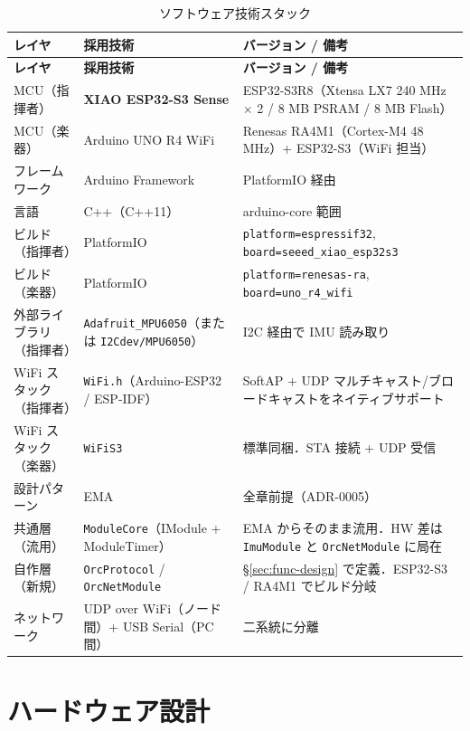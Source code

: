 \documentclass[lualatex,book,paper=a4paper,jafontsize=11.5pt,jafontscale=1.05]{jlreq}
\begin{document}
\begin{longtable}{p{} p{} p{}}
\caption{ソフトウェア技術スタック}\label{tab:sw-stack}\\
\toprule
\textbf{レイヤ} & \textbf{採用技術} & \textbf{バージョン / 備考} \\
\midrule
\endfirsthead
\toprule
\textbf{レイヤ} & \textbf{採用技術} & \textbf{バージョン / 備考} \\
\midrule
\endhead
MCU（指揮者）        & \textbf{XIAO ESP32-S3 Sense}  & ESP32-S3R8（Xtensa LX7 240 MHz × 2 / 8 MB PSRAM / 8 MB Flash） \\
MCU（楽器）          & Arduino UNO R4 WiFi          & Renesas RA4M1（Cortex-M4 48 MHz）+ ESP32-S3（WiFi 担当） \\
フレームワーク       & Arduino Framework            & PlatformIO 経由 \\
言語                 & C++（C++11）                 & arduino-core 範囲 \\
ビルド（指揮者）     & PlatformIO                   & \texttt{platform=espressif32}, \texttt{board=seeed\_xiao\_esp32s3} \\
ビルド（楽器）       & PlatformIO                   & \texttt{platform=renesas-ra}, \texttt{board=uno\_r4\_wifi} \\
外部ライブラリ（指揮者）& \texttt{Adafruit\_MPU6050}（または \texttt{I2Cdev/MPU6050}）& I2C 経由で IMU 読み取り \\
WiFi スタック（指揮者）& \texttt{WiFi.h}（Arduino-ESP32 / ESP-IDF）& SoftAP + UDP マルチキャスト/ブロードキャストをネイティブサポート \\
WiFi スタック（楽器）& \texttt{WiFiS3}              & 標準同梱．STA 接続 + UDP 受信 \\
設計パターン         & EMA                          & 全章前提（ADR-0005） \\
共通層（流用）       & \texttt{ModuleCore}（IModule + ModuleTimer） & EMA からそのまま流用．HW 差は \texttt{ImuModule} と \texttt{OrcNetModule} に局在 \\
自作層（新規）       & \texttt{OrcProtocol} / \texttt{OrcNetModule} & \S\ref{sec:func-design} で定義．ESP32-S3 / RA4M1 でビルド分岐 \\
ネットワーク         & UDP over WiFi（ノード間）+ USB Serial（PC 間） & 二系統に分離 \\
\bottomrule
\end{longtable}


\section{ハードウェア設計}\label{sec:hw-design}
\end{document}
